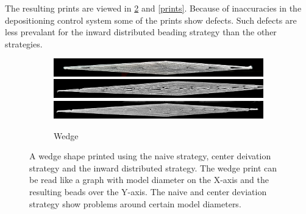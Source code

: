 The resulting prints are viewed in \cref{wedge_print} and \cref{prints}.
Because of inaccuracies in the depositioning control system some of the prints show defects.
Such defects are less prevalant for the inward distributed beading strategy than the other strategies.


\begin{figure}
\centering
\begin{subfigure}{\columnwidth}\centering
\setlength{\figwidth}{\columnwidth}
\includegraphics[width=\figwidth]{sources/applications/P3_print_wedge_naive_edited.png}
\includegraphics[width=\figwidth]{sources/applications/P3_print_wedge_center_edited.png}
\includegraphics[width=\figwidth]{sources/applications/P3_print_wedge_inward_edited.png}
\caption{Wedge}\label{print_wedge}
\end{subfigure}
\caption{
A wedge shape printed using the naive strategy, center deivation strategy and the inward distributed strategy.
The wedge print can be read like a graph with model diameter on the X-axis and the resulting beads over the Y-axis.
The naive and center deviation strategy show problems around certain model diameters.
}
\label{wedge_print}
\end{figure}


